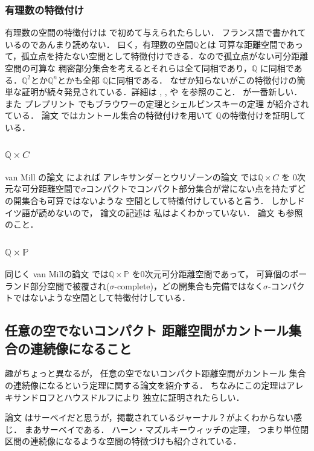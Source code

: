 \documentclass[leqno, a4paper, 12pt]{jsarticle}
\newcommand{\qq}{\mathbb{Q}}
\newcommand{\pp}{\mathbb{P}}
\begin{document}
\subsubsection{有理数の特徴付け}

有理数の空間の特徴付けは
\cite{sierpinski1920propriete}
で初めて与えられたらしい．
フランス語で書かれているのであんまり読めない．
曰く，有理数の空間$\qq$とは
可算な距離空間であって，孤立点を持たない空間として特徴付けできる．なので孤立点がない可分距離空間の可算な
稠密部分集合を考えるとそれらは全て同相であり，$\qq$
に同相である．$\qq^{2}$とか$\qq^{n}$とかも全部
$\qq$に同相である．
なぜか知らないがこの特徴付けの簡単な証明が続々発見されている．詳細は
\cite{MR3949184}, 
\cite{MR4079948}, 
や
\cite{MR4217759}
を参照のこと．
\cite{MR4217759}が一番新しい．
また
プレプリント
\cite{francis2012two}
でもブラウワーの定理とシェルピンスキーの定理
が紹介されている．
論文
\cite{MR0644644}
ではカントール集合の特徴付けを用いて
$\qq$の特徴付けを証明している．

\subsubsection{$\qq\times C$}
van Mill
の論文
\cite{MR0597877}
によれば
アレキサンダーとウリゾーンの論文
\cite{MR1512393}
では$\qq\times C$
を
$0$次元な可分距離空間で$\sigma$コンパクトでコンパクト部分集合が常にない点を持たずどの開集合も可算ではないような
空間として特徴付けしていると言う．
しかしドイツ語が読めないので，
論文\cite{MR1512393}の記述は
私はよくわかっていない．
論文
\cite{MR1391294}
も参照のこと．


\subsubsection{$\qq\times \pp$}
同じく
van Millの論文
\cite{MR0597877}
では$\qq\times \pp$
を$0$次元可分距離空間であって，
可算個のポーランド部分空間で被覆され($\sigma$-complete)，どの開集合も完備ではなく$\sigma$-コンパクトではないような空間として特徴付けしている．


\subsection{任意の空でないコンパクト
距離空間がカントール集合の連続像になること}
趣がちょっと異なるが，
任意の空でないコンパクト距離空間がカントール
集合の連続像になるという定理に関する論文を紹介する．
ちなみにこの定理はアレキサンドロフとハウスドルフにより
独立に証明されたらしい．

論文
\cite{koudela2007hausdorff}
はサーベイだと思うが，掲載されているジャーナル？がよくわからない感じ．
まあサーベイである．
ハーン・マズルキーウィッチの定理，
つまり単位閉区間の連続像になるような空間の特徴づけも紹介されている．
\end{document}
